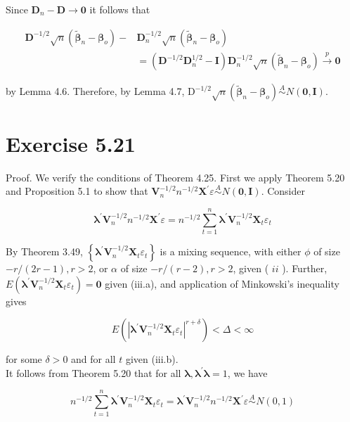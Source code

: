 \documentclass[10pt]{article}
\begin{document}
Since $\mathbf{D}_{n}-\mathbf{D} \rightarrow \mathbf{0}$ it follows that

$$
\begin{aligned}
\mathbf{D}^{-1 / 2} \sqrt{n}\left(\tilde{\boldsymbol{\beta}}_{n}-\boldsymbol{\beta}_{o}\right)- & \mathbf{D}_{n}^{-1 / 2} \sqrt{n}\left(\tilde{\boldsymbol{\beta}}_{n}-\boldsymbol{\beta}_{o}\right) \\
& =\left(\mathbf{D}^{-1 / 2} \mathbf{D}_{n}^{1 / 2}-\mathbf{I}\right) \mathbf{D}_{n}^{-1 / 2} \sqrt{n}\left(\tilde{\boldsymbol{\beta}}_{n}-\boldsymbol{\beta}_{o}\right) \xrightarrow{p} \mathbf{0}
\end{aligned}
$$

by Lemma 4.6. Therefore, by Lemma 4.7, $\mathrm{D}^{-1 / 2} \sqrt{n}\left(\tilde{\boldsymbol{\beta}}_{n}-\boldsymbol{\beta}_{o}\right) \stackrel{A}{\sim} N(\mathbf{0}, \mathbf{I})$.

\section*{Exercise 5.21}
Proof. We verify the conditions of Theorem 4.25. First we apply Theorem 5.20 and Proposition 5.1 to show that $\mathbf{V}_{n}^{-1 / 2} n^{-1 / 2} \mathbf{X}^{\prime} \varepsilon \stackrel{A}{\sim} N(\mathbf{0}, \mathbf{I})$. Consider

$$
\boldsymbol{\lambda}^{\prime} \mathbf{V}_{n}^{-1 / 2} n^{-1 / 2} \mathbf{X}^{\prime} \varepsilon=n^{-1 / 2} \sum_{t=1}^{n} \boldsymbol{\lambda}^{\prime} \mathbf{V}_{n}^{-1 / 2} \mathbf{X}_{t} \varepsilon_{t}
$$

By Theorem 3.49, $\left\{\boldsymbol{\lambda}^{\prime} \mathbf{V}_{n}^{-1 / 2} \mathbf{X}_{t} \varepsilon_{t}\right\}$ is a mixing sequence, with either $\phi$ of size $-r /(2 r-1), r>2$, or $\alpha$ of size $-r /(r-2), r>2$, given ( $i i$ ). Further, $E\left(\boldsymbol{\lambda}^{\prime} \mathbf{V}_{n}^{-1 / 2} \mathbf{X}_{t} \varepsilon_{t}\right)=\mathbf{0}$ given (iii.a), and application of Minkowski's inequality gives

$$
E\left(\left|\boldsymbol{\lambda}^{\prime} \mathbf{V}_{n}^{-1 / 2} \mathbf{X}_{t} \varepsilon_{t}\right|^{r+\delta}\right)<\Delta<\infty
$$

for some $\delta>0$ and for all $t$ given (iii.b).\\
It follows from Theorem 5.20 that for all $\boldsymbol{\lambda}, \boldsymbol{\lambda}^{\prime} \boldsymbol{\lambda}=1$, we have

$$
n^{-1 / 2} \sum_{t=1}^{n} \boldsymbol{\lambda}^{\prime} \mathbf{V}_{n}^{-1 / 2} \mathbf{X}_{t} \varepsilon_{t}=\boldsymbol{\lambda}^{\prime} \mathbf{V}_{n}^{-1 / 2} n^{-1 / 2} \mathbf{X}^{\prime} \varepsilon \stackrel{A}{\sim} N(0,1)
$$
\end{document}
